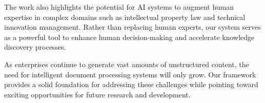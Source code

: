\documentclass[11pt,a4paper]{article}
\begin{document}
The work also highlights the potential for AI systems to augment human expertise in complex domains such as intellectual property law and technical innovation management. Rather than replacing human experts, our system serves as a powerful tool to enhance human decision-making and accelerate knowledge discovery processes.

As enterprises continue to generate vast amounts of unstructured content, the need for intelligent document processing systems will only grow. Our framework provides a solid foundation for addressing these challenges while pointing toward exciting opportunities for future research and development.


\end{document}
